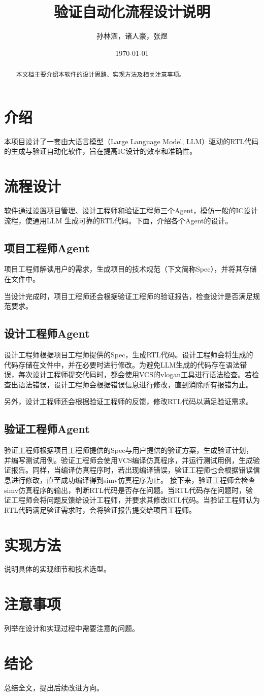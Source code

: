 \documentclass[UTF8]{ctexart}
\title{验证自动化流程设计说明}
\author{孙林涵，诸人豪，张煜}
\date{\today}
\begin{document}
\maketitle

\begin{abstract}
本文档主要介绍本软件的设计思路、实现方法及相关注意事项。
\end{abstract}

\section{介绍}
本项目设计了一套由大语言模型（Large Language Model, LLM）驱动的RTL代码的生成与验证自动化软件，旨在提高IC设计的效率和准确性。

\section{流程设计}
软件通过设置项目管理、设计工程师和验证工程师三个Agent，模仿一般的IC设计流程，使通用LLM
生成可靠的RTL代码。下面，介绍各个Agent的设计。

\subsection{项目工程师Agent}
项目工程师解读用户的需求，生成项目的技术规范（下文简称Spec），并将其存储在文件中。

当设计完成时，项目工程师还会根据验证工程师的验证报告，检查设计是否满足规范要求。


\subsection{设计工程师Agent}
设计工程师根据项目工程师提供的Spec，生成RTL代码。设计工程师会将生成的代码存储在文件中，并在必要时进行修改。为避免LLM生成的代码存在语法错误，每次设计工程师提交代码时，都会使用VCS的vlogan工具进行语法检查。若检查出语法错误，设计工程师会根据错误信息进行修改，直到消除所有报错为止。

另外，设计工程师还会根据验证工程师的反馈，修改RTL代码以满足验证需求。

\subsection{验证工程师Agent}
验证工程师根据项目工程师提供的Spec与用户提供的验证方案，生成验证计划，并编写测试用例。验证工程师会使用VCS编译仿真程序，并运行测试用例，生成验证报告。同样，当编译仿真程序时，若出现编译错误，验证工程师也会根据错误信息进行修改，直至成功编译得到simv仿真程序为止。
接下来，验证工程师会检查simv仿真程序的输出，判断RTL代码是否存在问题。当RTL代码存在问题时，验证工程师会将问题反馈给设计工程师，并要求其修改RTL代码。当验证工程师认为RTL代码满足验证需求时，会将验证报告提交给项目工程师。


\section{实现方法}
说明具体的实现细节和技术选型。

\section{注意事项}
列举在设计和实现过程中需要注意的问题。

\section{结论}
总结全文，提出后续改进方向。
\end{document}
